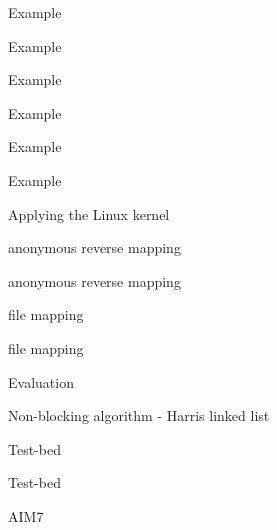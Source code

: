 \documentclass[english]{beamer} %
\begin{document}
\begin{frame}{Example}
\end{frame}

\begin{frame}{Example}
\end{frame}

\begin{frame}{Example}
\end{frame}

\begin{frame}{Example}
\end{frame}

\begin{frame}{Example}
\end{frame}

\begin{frame}{Example}
\end{frame}

\begin{frame}{Applying the Linux kernel}
\end{frame}



\begin{frame}{anonymous reverse mapping}
\end{frame}


\begin{frame}{anonymous reverse mapping}
\end{frame}


\begin{frame}{file mapping}
\end{frame}


\begin{frame}{file mapping}
\end{frame}



\begin{frame}{Evaluation}
\end{frame}


\begin{frame}{Non-blocking algorithm - Harris linked list}
\end{frame}

\begin{frame}{Test-bed}
\end{frame}


\begin{frame}{Test-bed}
\end{frame}


\begin{frame}{AIM7}
\end{frame}
\end{document}
